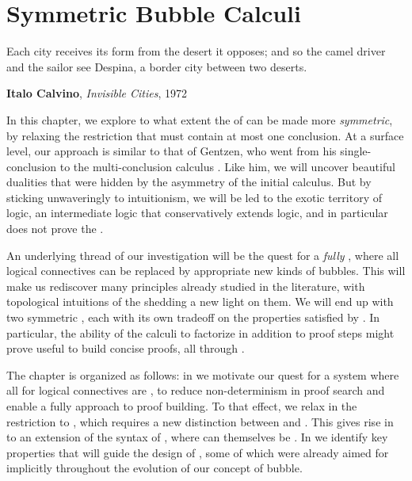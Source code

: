 \setchapterpreamble[u]{\margintoc}
\chapter{Symmetric Bubble Calculi}

\epigraph{Each city receives its form from the desert it opposes; and so the
camel driver and the sailor see Despina, a border city between two
deserts.}{\textbf{Italo Calvino}, \textit{Invisible Cities}, 1972}


\begin{scope}


In this chapter, we explore to what extent the  of
 can be made more \emph{symmetric}, by relaxing the restriction
that  must contain at most one conclusion. At a surface level, our
approach is similar to that of Gentzen, who went from his single-conclusion
  to the multi-conclusion calculus . Like
him, we will uncover beautiful dualities that were hidden by the asymmetry of
the initial calculus. But by sticking unwaveringly to intuitionism, we will be
led to the exotic territory of  logic, an intermediate
logic that conservatively extends  logic, and in particular
does not prove the .

An underlying thread of our investigation will be the quest for a \emph{fully
} , where all logical connectives can be replaced by
appropriate new kinds of bubbles. This will make us rediscover many principles
already studied in the  literature, with topological
intuitions of the   shedding a new light on them. We
will end up with two symmetric , each with its own tradeoff
on the properties satisfied by . In particular, the ability
of the calculi to factorize \emph{} in addition to 
proof steps might prove useful to build concise proofs, all through .

The chapter is organized as follows: in  we motivate our
quest for a system where all  for logical connectives are
\emph{}, to reduce non-determinism in proof search and enable a
fully \emph{} approach to proof building. To that effect, we relax in
 the restriction to  ,
which requires a new distinction between \emph{} and
\emph{} . This gives rise in  to an
extension of the syntax of , where  can themselves be
\emph{}. In  we identify key properties that
will guide the design of , some of which were already aimed
for implicitly throughout the evolution of our concept of bubble.


\end{scope}
